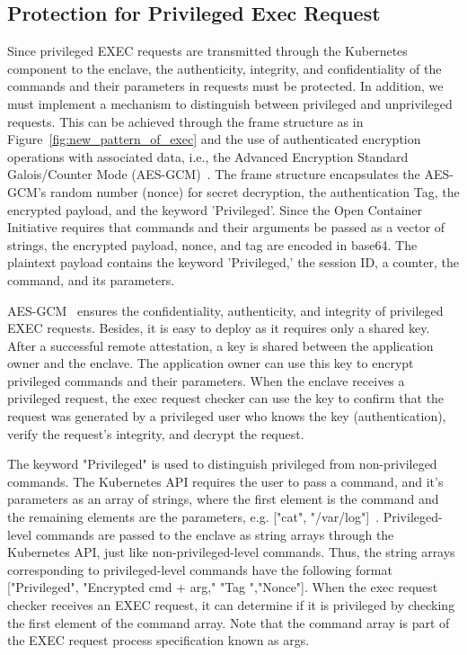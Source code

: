 \subsection{Protection for Privileged Exec Request}
Since privileged EXEC requests are transmitted through the Kubernetes  component to the enclave, the authenticity, integrity, and confidentiality of the commands and their parameters in requests must be protected. In addition, we must implement a mechanism 
to distinguish between privileged and unprivileged requests. This can be achieved through the frame structure as in Figure~\ref{fig:new_pattern_of_exec} and the use of authenticated encryption operations with associated data, i.e., the Advanced 
Encryption Standard Galois/Counter Mode (AES-GCM)~\cite*{aes_gcm}. The frame structure encapsulates the AES-GCM's random number (nonce) for secret decryption, the authentication Tag, the encrypted payload, and the keyword 'Privileged'. Since the Open Container 
Initiative requires that commands and their arguments be passed as a vector of strings, the encrypted payload, nonce, and tag are encoded in base64. The plaintext payload contains the keyword 'Privileged,' the session ID, a counter, the command, 
and its parameters.

AES-GCM~\cite*{aes_gcm} ensures the confidentiality, authenticity, and integrity of privileged EXEC requests. Besides, it is easy to deploy as it requires only a shared key. After a successful remote attestation, a key is shared between the application owner and 
the enclave. The application owner can use this key to encrypt privileged commands and their parameters. When the enclave receives a privileged request, the exec request checker can use the key to confirm that the request was generated by a 
privileged user who knows the key (authentication), verify the request's integrity, and decrypt the request.


The keyword "Privileged" is used to distinguish privileged from non-privileged commands. The Kubernetes API requires the user to pass a command, and it's parameters as an array of strings, where the first element is the command and the remaining elements 
are the parameters, e.g. ["cat", "/var/log"]~\cite*{k8s}. Privileged-level commands are passed to the enclave as string arrays through the Kubernetes  API, just like non-privileged-level commands. Thus, the string arrays corresponding to privileged-level commands have 
the following format ["Privileged", "Encrypted cmd + arg," "Tag ","Nonce"]. When the exec request checker receives an EXEC request, it can determine if it is privileged by checking the first element of the command array. Note that the command array 
is part of the EXEC request process specification known as args.


